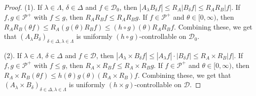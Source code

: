 \documentclass[12pt,a4paper]{amsart}
\theoremstyle{plain}
\theoremstyle{definition}
\numberwithin{equation}{section}
\begin{document}
\begin{proof}
    (1). 
If $\lambda \in \Lambda$, $\delta \in \Delta$ and $f\in \mathcal D_0$, then $|A_\lambda B_\delta f| \leq R_A |B_\delta f| \leq R_A R_B |f|$.
 If $f,g \in \mathcal P^+$ with $f\leq g$, then $R_AR_Bf \leq R_A R_B g$.
 If $f \in \mathcal P^+$ and $\theta \in [0,\infty)$, then $R_AR_B(\theta f) \leq R_A(g(\theta) R_Bf) \leq (h\circ g)(\theta) R_A R_B f $.
Combining these, we get that
    $(A_\lambda B_\delta)_{\delta\in \Delta, \lambda \in \Lambda}$ is uniformly $(h \circ g)$-controllable on $\mathcal D_0$.
    
    (2). 
If $\lambda \in \Lambda$, $\delta \in \Delta$ and $f\in \mathcal D$, then $|A_\lambda \times B_\delta f| \leq |A_\lambda f| \cdot |B_\delta f| \leq R_A \times R_B |f|$.
If $f,g \in \mathcal P^+$ with $f\leq g$, then $R_A\times R_Bf \leq R_A\times R_B g$.
If $f \in \mathcal P^+$ and $\theta \in [0,\infty)$, then $R_A\times R_B (\theta f) \leq h(\theta) g(\theta) (R_A \times R_B) f $.
Combining these, we get that $(A_\lambda \times B_\delta)_{\delta\in \Delta, \lambda \in \Lambda}$ is uniformly $(h \times g)$-controllable on $\mathcal D$.


\end{proof}
\end{document}
